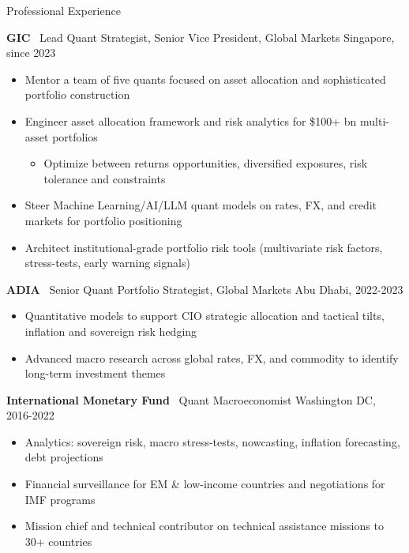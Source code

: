 \documentclass[usegeometry, 10pt, a4paper]{cv} %
\newcommand{\activite}[1]{\textbf{#1}\ }
\begin{document}
\begin{rubriquetableau}[0.95\textwidth]{Professional Experience}\\
\vspace{-0.5cm}

\activite{GIC} Lead Quant Strategist, Senior Vice President, Global Markets \hfill
Singapore, since 2023 \\ \vspace{-0.4cm}
\begin{itemize}
  \item Mentor a team of five quants focused on asset allocation and sophisticated portfolio construction
  \item Engineer asset allocation framework and risk analytics for \$100+ bn multi-asset portfolios
  \begin{itemize}
  \item Optimize between returns opportunities, diversified exposures, risk tolerance and constraints
  \end{itemize} 
  \item Steer Machine Learning/AI/LLM quant models on rates, FX, and credit markets for portfolio positioning
  \item Architect institutional-grade portfolio risk tools (multivariate risk factors, stress-tests, early warning signals) 
\end{itemize} 

\vspace{0.4cm}

\activite{ADIA} Senior Quant Portfolio Strategist, Global Markets  \hfill
Abu Dhabi, 2022-2023 \\ \vspace{-0.2cm}
\begin{itemize}[]
\item Quantitative models to support CIO strategic allocation and tactical tilts, inflation and sovereign risk hedging
\item Advanced macro research across global rates, FX, and commodity to identify long-term investment themes
 \end{itemize}
 
\vspace{0.4cm}

\activite{International Monetary Fund} Quant Macroeconomist \hfill Washington DC, 2016-2022 \\
\vspace{-0.2cm}

\begin{itemize}[]
  \item Analytics: sovereign risk, macro stress-tests, nowcasting, inflation forecasting, debt projections
  \item Financial surveillance for EM \& low-income countries and negotiations for IMF programs 
  \item Mission chief and technical contributor on technical assistance missions to 30+ countries 
  \end{itemize}  
\vspace{0.4cm}


\end{rubriquetableau}
\end{document}
